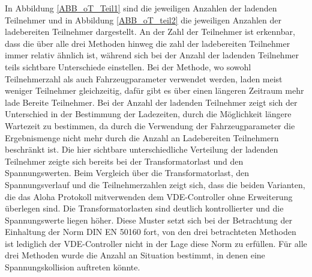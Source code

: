 In Abbildung \ref{ABB_oT_Teil1} sind die jeweiligen Anzahlen der ladenden Teilnehmer und in Abbildung \ref{ABB_oT_teil2} die jeweiligen Anzahlen der ladebereiten Teilnehmer dargestellt. An der Zahl der Teilnehmer ist erkennbar, dass die über alle drei Methoden hinweg die zahl der ladebereiten Teilnehmer immer relativ ähnlich ist, während sich bei der Anzahl der ladenden Teilnehmer teils sichtbare Unterschiede einstellen. Bei der Methode, wo sowohl Teilnehmerzahl als auch Fahrzeugparameter verwendet werden, laden meist weniger Teilnehmer gleichzeitig, dafür gibt es über einen längeren Zeitraum mehr lade Bereite Teilnehmer. Bei der Anzahl der ladenden Teilnehmer zeigt sich der Unterschied in der Bestimmung der Ladezeiten, durch die Möglichkeit längere Wartezeit zu bestimmen, da durch die Verwendung der Fahrzeugparameter die Ergebnismenge nicht mehr durch die Anzahl an Ladebereiten Teilnehmern beschränkt ist. Die hier sichtbare unterschiedliche Verteilung der ladenden Teilnehmer zeigte sich bereits bei der Transformatorlast und den Spannungswerten.
Beim Vergleich über die Transformatorlast, den Spannungsverlauf und die Teilnehmerzahlen zeigt sich, dass die beiden Varianten, die das Aloha Protokoll mitverwenden dem VDE-Controller ohne Erweiterung überlegen sind. Die Transformatorlasten sind deutlich kontrollierter und die Spannungswerte liegen höher. Diese Muster setzt sich bei der Betrachtung der Einhaltung der Norm DIN EN 50160 fort, von den drei betrachteten Methoden ist lediglich der VDE-Controller nicht in der Lage diese Norm zu erfüllen.
Für alle drei Methoden wurde die Anzahl an Situation bestimmt, in denen eine Spannungskollision auftreten könnte.
